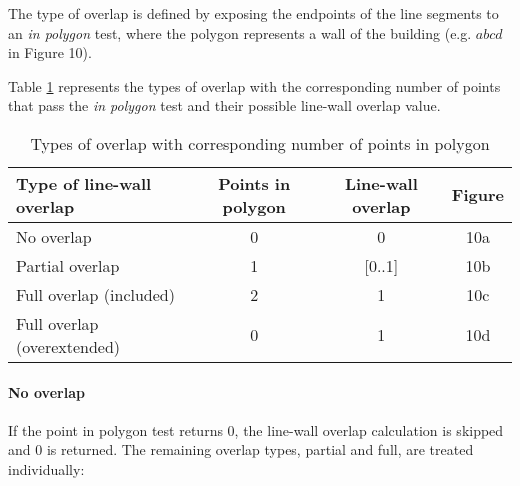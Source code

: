 
	The type of overlap is defined by exposing the endpoints of the line
	segments to an \emph{in polygon} test, where the polygon represents a 
	wall of the building (e.g. $abcd$ in Figure 10).

	Table \ref{tab:lwatypes} represents the types of overlap with the corresponding number of points
	that pass the \emph{in polygon} test and their possible line-wall overlap
	value.\\ 

	\begin{table}[ht]
		\caption{Types of overlap with corresponding number of points in polygon}
		\label{tab:lwatypes}

		\begin{tabular}{|l||c|c|c|}
		\hline
		Type of line-wall overlap 			&	Points in polygon 			& Line-wall overlap & Figure \\
		\hline
		\hline
		No overlap					&	0					& 0		& 10a\\
		\hline
		Partial overlap 				&	1					& [0..1]	& 10b\\
		\hline
		Full overlap (included)		&	2					& 1		& 10c\\
		\hline
		Full overlap (overextended)		&  	0					& 1 		& 10d\\
		\hline
		\end{tabular}
	\end{table}

	\paragraph{No overlap}
	If the point in polygon test returns 0, the line-wall overlap calculation
	is skipped and 0 is returned. The remaining overlap types, partial and full,
	are treated individually:\\



